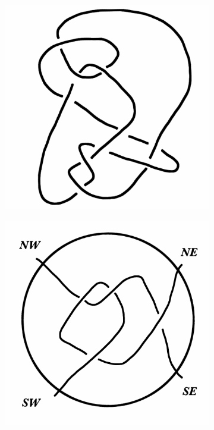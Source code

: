 \documentclass[12pt]{amsart}
\begin{document}
\begin{figure}
\begin{subfigure}[b]{0.2\textwidth}
\end{subfigure}\qquad
\begin{subfigure}[b]{0.2\textwidth}
\includegraphics[width=\textwidth]{images/hk-hardunknot.png}
\end{subfigure}\qquad
\begin{subfigure}[b]{0.2\textwidth}
\includegraphics[width=\textwidth]{images/tangle.png}
\end{subfigure}
\end{figure}
\end{document}
